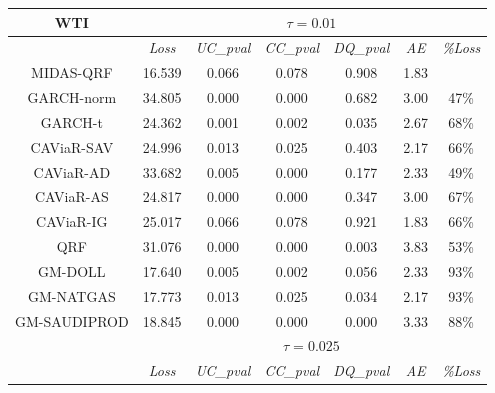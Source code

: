 \begin{table}[H]
\renewcommand{\arraystretch}{0.72}
\centering
\begin{tabular}{ccccccc}
\hline
\textbf{WTI}                           & \multicolumn{6}{c}{$\tau=0.01$}                         \\ \hline
                                                        & \textit{Loss}   & \textit{UC\_pval} & \textit{CC\_pval} & \textit{DQ\_pval }& \textit{AE }  & \textit{\%Loss} \\ \hline
\rowcolor[HTML]{D9D9D9} MIDAS-QRF  & 16.539 & 0.066    & 0.078    & 0.908    & 1.83 &        \\
GARCH-norm                                              & 34.805 & 0.000    & 0.000    & 0.682    & 3.00 & 47\%   \\
GARCH-t                                                 & 24.362 & 0.001    & 0.002    & 0.035    & 2.67 & 68\%   \\
\rowcolor[HTML]{D9D9D9}CAViaR-SAV                                              & 24.996 & 0.013    & 0.025    & 0.403    & 2.17 & 66\%   \\
CAViaR-AD                                               & 33.682 & 0.005    & 0.000    & 0.177    & 2.33 & 49\%   \\
CAViaR-AS                                               & 24.817 & 0.000    & 0.000    & 0.347    & 3.00 & 67\%   \\
\rowcolor[HTML]{D9D9D9} CAViaR-IG  & 25.017 & 0.066    & 0.078    & 0.921    & 1.83 & 66\%   \\
QRF                                                     & 31.076 & 0.000    & 0.000    & 0.003    & 3.83 & 53\%   \\
GM-DOLL                                                 & 17.640 & 0.005    & 0.002    & 0.056    & 2.33 & 93\%   \\
\rowcolor[HTML]{D9D9D9}GM-NATGAS                                               & 17.773 & 0.013    & 0.025    & 0.034    & 2.17 & 93\%   \\
GM-SAUDIPROD                                            & 18.845 & 0.000    & 0.000    & 0.000    & 3.33 & 88\%   \\ \hline
                                                        & \multicolumn{6}{c}{$\tau=0.025$}                        \\ \hline
                                                        & \textit{Loss}   & \textit{UC\_pval} & \textit{CC\_pval} & \textit{DQ\_pval }& \textit{AE }  & \textit{\%Loss}\\ \hline

\end{tabular}
\end{table}
